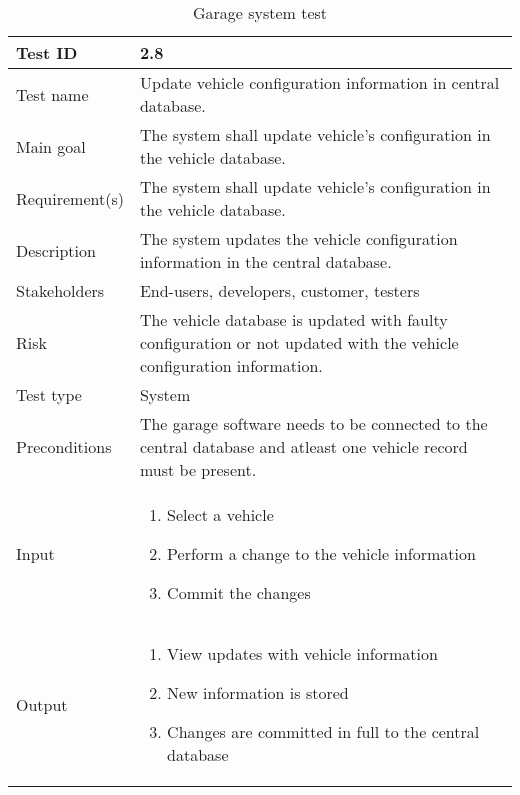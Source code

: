 \begin{table}[H]
\centering
\caption{Garage system test}
\begin{tabularx}{1.0\textwidth}{
    |p{}     %
    |p{}|    %
}
\hline

Test ID
& 2.8
\\
\hline

Test name
& Update vehicle configuration information in central database.
\\
\hline

Main goal
& The system shall update vehicle's configuration in the vehicle database.
\\
\hline

Requirement(s)
& The system shall update vehicle's configuration in the vehicle database.
\\
\hline

Description
& The system updates the vehicle configuration information in the central database.
\\
\hline

Stakeholders
& End-users, developers, customer, testers
\\
\hline

Risk
& The vehicle database is updated with faulty configuration or not updated with the vehicle configuration information.
\\
\hline

Test type
& System
\\
\hline

Preconditions
& The garage software needs to be connected to the central database and atleast one vehicle record must be present.
\\
\hline

Input
& \begin{enumerate}
    \item Select a vehicle
    \item Perform a change to the vehicle information
    \item Commit the changes
\end{enumerate}
\\
\hline

Output
& \begin{enumerate}
    \item View updates with vehicle information
    \item New information is stored
    \item Changes are committed in full to the central database
\end{enumerate}
\\
\hline


\end{tabularx}
\end{table}
